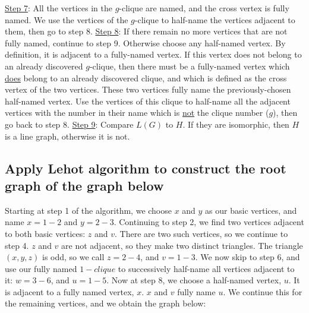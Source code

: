 \documentclass[11pt]{article}
\begin{document}
\newline
\newline
\noindent
\underline{Step 7}:
All the vertices in the $g$-clique are named, and the cross vertex is fully named.
We use the vertices of the $g$-clique to half-name the vertices adjacent to them, then go to step 8.
\newline
\newline
\noindent
\underline{Step 8}:
If there remain no more vertices that are not fully named, continue to step 9.
Otherwise choose any half-named vertex.
By definition, it is adjacent to a fully-named vertex.
If this vertex does not belong to an already discovered $g$-clique, then there must be a fully-named vertex which \underline{does} belong to an already discovered clique, and which is defined as the cross vertex of the two vertices.
These two vertices fully name the previously-chosen half-named vertex.
Use the vertices of this clique to half-name all the adjacent vertices with the number in their name which is \underline{not} the clique number ($g$), then go back to step 8.
\newline
\newline
\noindent
\underline{Step 9}:
Compare $L(G)$ to $H$. If they are isomorphic, then $H$ is a line graph, otherwise it is not.

\subsection{Apply Lehot algorithm to construct the root graph of the graph below}

\begin{figure}[H]
\centering

\end{figure}
Starting at step 1 of the algorithm, we choose $x$ and $y$ as our basic vertices, and name $x=1-2$ and $y=2-3$.
Continuing to step 2, we find two vertices adjacent to both basic vertices: $z$ and $v$.
There are two such vertices, so we continue to step 4.
$z$ and $v$ are not adjacent, so they make two distinct triangles.
The triangle $(x,y,z)$ is odd, so we call $z=2-4$, and $v=1-3$.
We now skip to step 6, and use our fully named $1-clique$ to successively half-name all vertices adjacent to it: $w=3-6$, and $u=1-5$.
Now at step 8, we choose a half-named vertex, $u$.
It is adjacent to a fully named vertex, $x$.
$x$ and $v$ fully name $u$.
We continue this for the remaining vertices, and we obtain the graph below:

\begin{figure}[H]
\centering

\end{figure}
\end{document}
